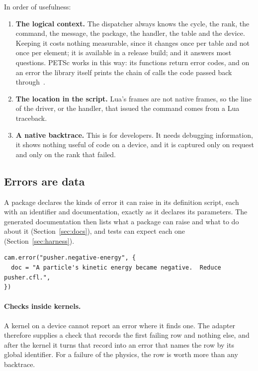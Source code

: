 \documentclass[11pt,a4paper]{article}
\begin{document}
In order of usefulness:

\begin{enumerate}
  \item \textbf{The logical context.}  The dispatcher always knows the
        cycle, the rank, the command, the message, the package, the handler,
        the table and the device.  Keeping it costs nothing measurable,
        since it changes once per table and not once per element; it is
        available in a release build; and it answers most questions.
        PETSc works in this way: its functions return error codes, and on
        an error the library itself prints the chain of calls the code
        passed back through~\cite{petscerrors}.
  \item \textbf{The location in the script.}  Lua's frames are not native
        frames, so the line of the driver, or the handler, that issued the
        command comes from a Lua traceback.
  \item \textbf{A native backtrace.}  This is for developers.  It needs
        debugging information, it shows nothing useful of code on a device,
        and it is captured only on request and only on the rank that
        failed.
\end{enumerate}

\subsection{Errors are data}

A package declares the kinds of error it can raise in its definition
script, each with an identifier and documentation, exactly as it declares
its parameters.  The generated documentation then lists what a package can
raise and what to do about it (Section~\ref{sec:docs}), and tests can
expect each one (Section~\ref{sec:harness}).

\begin{lstlisting}[language={[5.3]Lua}]
cam.error("pusher.negative-energy", {
  doc = "A particle's kinetic energy became negative.  Reduce pusher.cfl.",
})
\end{lstlisting}

\paragraph{Checks inside kernels.}  A kernel on a device cannot report an
error where it finds one.  The adapter therefore supplies a check that
records the first failing row and nothing else, and after the kernel it
turns that record into an error that names the row by its global
identifier.  For a failure of the physics, the row is worth more than any
backtrace.
\end{document}

